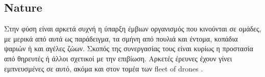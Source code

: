 \subsection{Nature} \label{sec:Chapter1-2-1}
Στην φύση είναι αρκετά συχνή η ύπαρξη έμβιων οργανισμός που κινούνται σε ομάδες, με μερικά από αυτά ως παράδειγμα, τα σμήνη από πουλιά και
έντομα, κοπάδια ψαριών ή και αγέλες ζώων. Σκοπός της συνεργασίας τους είναι κυρίως η προστασία από θηρευτές ή άλλοι σχετικοί με την επιβίωση.
Αρκετές έρευνες έχουν γίνει εμπνευσμένες σε αυτό, ακόμα και στον τομέα των fleet of drones
\cite{research-on-drone-swarms-move-like-animals} \cite{research-on-drone-swarms-move-like-animals-like-documentary} \cite{swarm-of-drones}.
  
